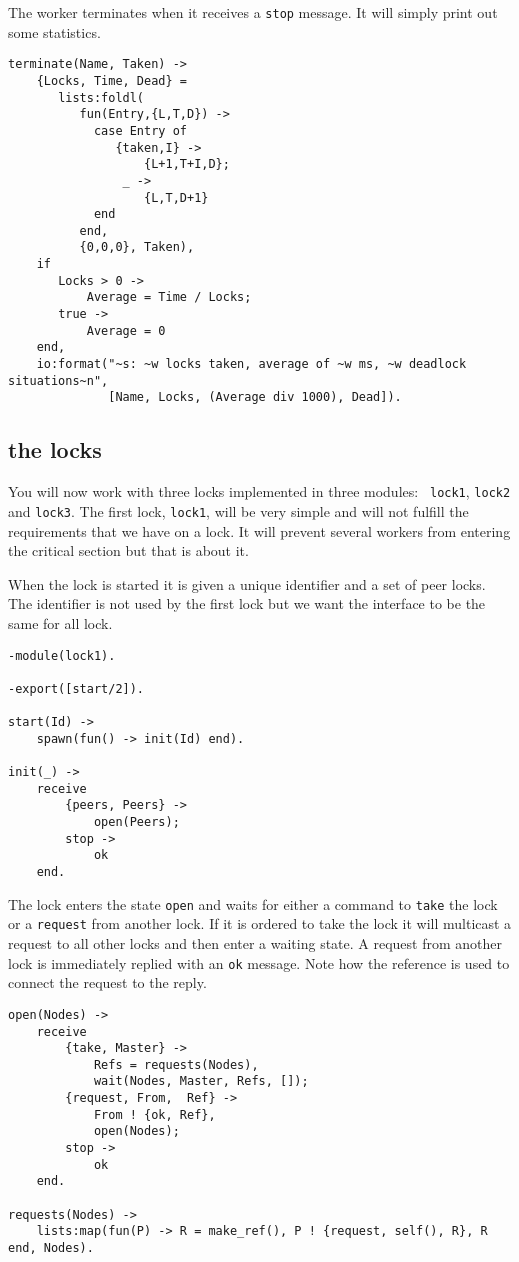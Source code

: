 \documentclass[a4paper, 11pt]{article}
\begin{document}
The worker terminates when it receives a {\tt stop} message. It 
will simply print out some statistics.

\begin{verbatim}
terminate(Name, Taken) ->
    {Locks, Time, Dead} = 
       lists:foldl(
          fun(Entry,{L,T,D}) -> 
            case Entry of 
               {taken,I} -> 
                   {L+1,T+I,D}; 
                _ -> 
                   {L,T,D+1} 
            end
          end, 
          {0,0,0}, Taken),
    if 
       Locks > 0 ->
           Average = Time / Locks;
       true ->
           Average = 0
    end,
    io:format("~s: ~w locks taken, average of ~w ms, ~w deadlock situations~n", 
              [Name, Locks, (Average div 1000), Dead]).

\end{verbatim}

\subsection{the locks}

You will now work with three locks implemented in three modules: {\tt
  lock1}, {\tt lock2} and {\tt lock3}. The first lock, {\tt lock1},
will be very simple and will not fulfill the requirements that we have
on a lock. It will prevent several workers from entering the critical
section but that is about it.

When the lock is started it is given a unique identifier and a set of
peer locks.  The identifier is not used by the first lock but we want the
interface to be the same for all lock. 

\begin{verbatim}
-module(lock1).

-export([start/2]).

start(Id) ->
    spawn(fun() -> init(Id) end).

init(_) ->
    receive 
        {peers, Peers} ->
            open(Peers);
        stop ->
            ok
    end.
\end{verbatim}

The lock enters the state {\tt open} and waits for either a command to
{\tt take} the lock or a {\tt request} from another lock. If it is
ordered to take the lock it will multicast a request to all other
locks and then enter a waiting state. A request from another lock is
immediately replied with an {\tt ok} message. Note how the reference
is used to connect the request to the reply.

\begin{verbatim}
open(Nodes) ->
    receive
        {take, Master} ->
            Refs = requests(Nodes),
            wait(Nodes, Master, Refs, []);
        {request, From,  Ref} ->
            From ! {ok, Ref},
            open(Nodes);
        stop ->
            ok
    end.

requests(Nodes) ->
    lists:map(fun(P) -> R = make_ref(), P ! {request, self(), R}, R end, Nodes).
\end{verbatim}
\end{document}
